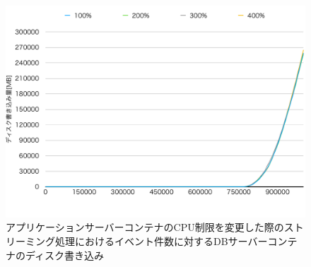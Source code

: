 \documentclass[../../../../../main]{subfiles}
\begin{document}
    \begin{figure}[H]
        \centering
        \includegraphics[width=12cm]{graph}
        \caption{アプリケーションサーバーコンテナのCPU制限を変更した際のストリーミング処理におけるイベント件数に対するDBサーバーコンテナのディスク書き込み}
        \label{fig:stream-change-app-cpu-limit-db-disk-in-app_1024-db_1_1024}
    \end{figure}
\end{document}
